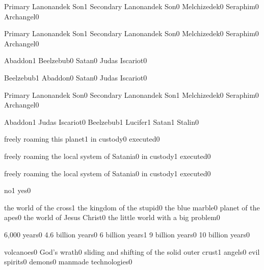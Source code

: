 {Primary Lanonandek Son}{1}
{Secondary Lanonandek Son}{0}
{Melchizedek}{0}
{Seraphim}{0}
{Archangel}{0}
\qstop

{Primary Lanonandek Son}{1}
{Secondary Lanonandek Son}{0}
{Melchizedek}{0}
{Seraphim}{0}
{Archangel}{0}
\qstop

{Abaddon}{1}
{Beelzebub}{0}
{Satan}{0}
{Judas Iscariot}{0}
\qstop

{Beelzebub}{1}
{Abaddon}{0}
{Satan}{0}
{Judas Iscariot}{0}
\qstop

{Primary Lanonandek Son}{0}
{Secondary Lanonandek Son}{1}
{Melchizedek}{0}
{Seraphim}{0}
{Archangel}{0}
\qstop

{Abaddon}{1}
{Judas Iscariot}{0}
{Beelzebub}{1}
{Lucifer}{1}
{Satan}{1}
{Stalin}{0}
\qstop

{freely roaming this planet}{1}
{in custody}{0}
{executed}{0}
\qstop

{freely roaming the local system of Satania}{0}
{in custody}{1}
{executed}{0}
\qstop

{freely roaming the local system of Satania}{0}
{in custody}{1}
{executed}{0}
\qstop




{no}{1}
{yes}{0}
\qstop


{the world of the cross}{1}
{the kingdom of the stupid}{0}
{the blue marble}{0}
{planet of the apes}{0}
{the world of Jesus Christ}{0}
{the little world with a big problem}{0}
\qstop

{6,000 years}{0}
{4.6 billion years}{0}
{6 billion years}{1}
{9 billion years}{0}
{10 billion years}{0}
\qstop


{volcanoes}{0}
{God's wrath}{0}
{sliding and shifting of the solid outer crust}{1}
{angels}{0}
{evil spirits}{0}
{demons}{0}
{manmade technologies}{0}
\qstop

